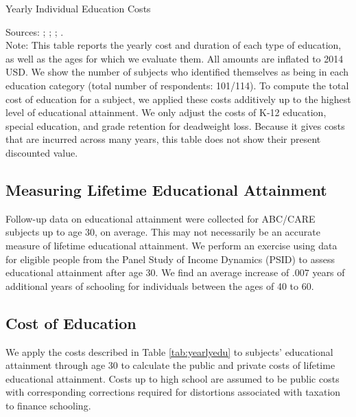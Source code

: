 \begin{table}[H]
\caption{Yearly Individual Education Costs} \label{tab:yearlyedu}
\centering
\begin{adjustbox}{max width=\textwidth}
\begin{threeparttable}
\footnotesize

\centering
\begin{tablenotes}%
\scriptsize
\item Sources: \citet{Snyder_Willow_2012_BOOK_NCES}; \citet{Hoenack_Weiler_1975_JHR}; \cite{Dhanidina_Griffith_1975_AEQ}; \cite{Freeman_1974_Occupational-Training_RES}. \\
 Note: This table reports the yearly cost and duration of each type of education, as well as the ages for which we evaluate them.  All amounts are inflated to 2014 USD.
We show the number of subjects who identified themselves as being in each education category (total number of respondents: 101/114). To compute the total cost of education for a subject, we applied these costs additively up to the highest level of educational attainment. We only adjust the costs of  K-12 education, special  education, and grade retention for deadweight loss. Because it gives costs that are incurred across many years, this table does not show their present discounted value.
\end{tablenotes}
\end{threeparttable}
\end{adjustbox}
\end{table}

\subsection{Measuring Lifetime Educational Attainment}

\noindent Follow-up data on educational attainment were collected for ABC/CARE subjects up to age 30, on average. This may not necessarily be an accurate measure of lifetime educational attainment. We perform an exercise using data for eligible people from the Panel Study of Income Dynamics (PSID) to assess educational attainment after age 30. We find an average increase of $.007$ years of additional years of schooling for individuals between the ages of 40 to 60.

\subsection{Cost of Education}
\noindent We apply the costs described in Table \ref{tab:yearlyedu} to subjects' educational attainment through age 30 to calculate the public and private costs of lifetime educational attainment. Costs up to high school are assumed to be public costs with corresponding corrections required for distortions associated with taxation to finance schooling.


